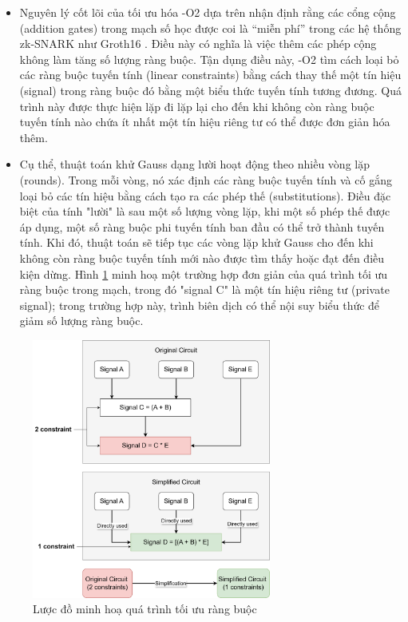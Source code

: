 \begin{enumerate}
\begin{itemize}
        \item Nguyên lý cốt lõi của tối ưu hóa -O2 dựa trên nhận định rằng các cổng cộng (addition gates) trong mạch số học được coi là ``miễn phí'' trong các hệ thống zk-SNARK như Groth16 \cite{albert2022distilling} \cite{diaz2023extending}. Điều này có nghĩa là việc thêm các phép cộng không làm tăng số lượng ràng buộc. Tận dụng điều này, -O2 tìm cách loại bỏ các ràng buộc tuyến tính (linear constraints) bằng cách thay thế một tín hiệu (signal) trong ràng buộc đó bằng một biểu thức tuyến tính tương đương. Quá trình này được thực hiện lặp đi lặp lại cho đến khi không còn ràng buộc tuyến tính nào chứa ít nhất một tín hiệu riêng tư có thể được đơn giản hóa thêm.
        \item Cụ thể, thuật toán khử Gauss dạng lười hoạt động theo nhiều vòng lặp (rounds). Trong mỗi vòng, nó xác định các ràng buộc tuyến tính và cố gắng loại bỏ các tín hiệu bằng cách tạo ra các phép thế (substitutions). Điều đặc biệt của tính "lười" là sau một số lượng vòng lặp, khi một số phép thế được áp dụng, một số ràng buộc phi tuyến tính ban đầu có thể trở thành tuyến tính. Khi đó, thuật toán sẽ tiếp tục các vòng lặp khử Gauss cho đến khi không còn ràng buộc tuyến tính mới nào được tìm thấy hoặc đạt đến điều kiện dừng. Hình \ref{fig:chapter3-SimplficationExample} minh hoạ một trường hợp đơn giản của quá trình tối ưu ràng buộc trong mạch, trong đó "signal C" là một tín hiệu riêng tư (private signal); trong trường hợp này, trình biên dịch có thể nội suy biểu thức để giảm số lượng ràng buộc.

    \end{itemize}
\end{enumerate}

\begin{figure}[H]
    \centering
    \includegraphics[width = 0.7\textwidth]{imgs/SimplificationExample.png}
    \caption{Lược đồ minh hoạ quá trình tối ưu ràng buộc}
    \label{fig:chapter3-SimplficationExample}
\end{figure}

